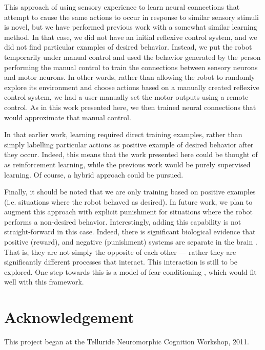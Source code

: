 \documentclass[conference]{IEEEtran}
\begin{document}
This approach of using sensory experience to learn neural connections
that attempt to cause the same actions to occur in response to similar
sensory stimuli is novel, but we have performed previous work \cite{conradt2014trainable}
with a somewhat similar learning method. In that case, we did not have an 
initial reflexive control system, and we did not find particular examples of 
desired behavior. Instead, we put the robot temporarily under manual control 
and used the behavior generated by the person performing the manual control 
to train the connections between sensory neurons and motor neurons.  In other
words, rather than allowing the robot to randomly explore its environment and
choose actions based on a manually created reflexive control system, we had
a user manually set the motor outputs using a remote control.  As in this work
presented here, we then trained neural connections that would approximate that
manual control.  

In that earlier work, learning required direct training examples, rather than 
simply labelling particular actions as positive example of desired behavior 
after they occur.  Indeed, this means that the work presented here could be 
thought of as reinforcement learning, while the previous work would be purely 
supervised learning. Of course, a hybrid approach could be pursued. 

Finally, it should be noted that we are only training based on positive 
examples (i.e. situations where the robot behaved as desired). In future work,
we plan to augment this approach with explicit punishment for situations where 
the robot performs a non-desired behavior. Interestingly, adding this capability
is not straight-forward in this case.  Indeed, there is significant biological 
evidence that positive (reward), and negative (punishment) systems are separate 
in the brain \cite{boureau2010}. That is, they are not simply the opposite of 
each other --- rather they are significantly different processes that interact. 
This interaction is still to be explored. One step towards this is a model
of fear conditioning \cite{kolbeck2013fear}, which would fit well with this framework.


\section*{Acknowledgement}

This project began at the Telluride Neuromorphic Cognition Workshop, 2011. 




\end{document}
